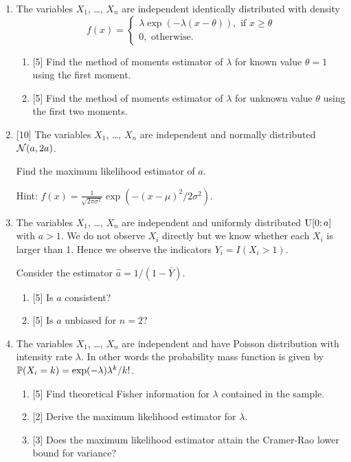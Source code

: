 \begin{enumerate}
    \item The variables $X_1$, \ldots, $X_n$ are independent identically distributed with density 
    \[
    f(x) = \begin{cases}
      \lambda \exp(-\lambda (x - \theta)), \text{ if } x\geq \theta \\
      0, \text{ otherwise}.
    \end{cases}  
    \]
    \begin{enumerate}
      \item {[5]} Find the method of moments estimator of $\lambda$ for known value $\theta = 1$ using the first moment. 
      \item {[5]} Find the method of moments estimator of $\lambda$ for unknown value $\theta$ using the first two moments. 
    \end{enumerate}

    \item {[10]} The variables $X_1$, \ldots, $X_n$ are independent and normally distributed $\cN(a, 2a)$.
  
    Find the maximum likelihood estimator of $a$.
  
    Hint: $f(x) = \frac{1}{\sqrt{2\pi \sigma^2}} \exp(-(x-\mu)^2/2\sigma^2)$.

    \item The variables $X_1$, \ldots, $X_n$ are independent and uniformly distributed $\dUnif[0;a]$ with $a>1$.
    We do not observe $X_i$ directly but we know whether each $X_i$ is larger than 1. 
    Hence we observe the indicators $Y_i = I(X_i > 1)$.
  
    Consider the estimator $\hat a = 1 / (1 - \bar Y)$.
  
    \begin{enumerate}
      \item {[5]} Is $\hat a$ consistent?
      \item {[5]} Is $\hat a$ unbiased for $n=2$?
    \end{enumerate}

    \item The variables $X_1$, \ldots, $X_n$ are independent and have Poisson distribution with intensity rate $\lambda$.
    In other words the probability mass function is given by $\P(X_i = k) = \exp(-\lambda) \lambda^k / k!$.
    
    \begin{enumerate}
      \item {[5]} Find theoretical Fisher information for $\lambda$ contained in the sample. 
      \item {[2]} Derive the maximum likelihood estimator for $\lambda$.
      \item {[3]} Does the maximum likelihood estimator attain the Cramer-Rao lower bound for variance? 
    \end{enumerate}


\end{enumerate}
